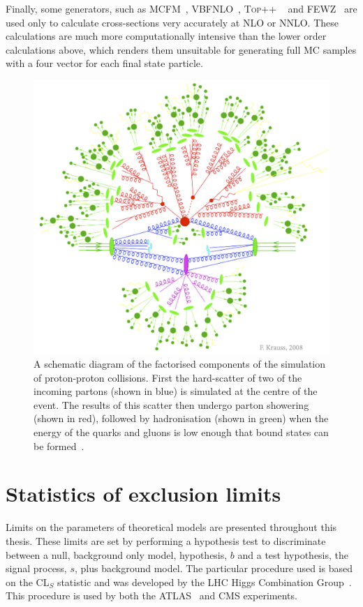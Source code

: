 Finally, some generators, such as MCFM~\cite{PhysRevD.68.094021}, VBFNLO~\cite{Baglio:2014uba,Arnold:2011wj,Arnold20091661}, \textsc{Top++} ~\cite{Czakon20142930} and \textsc{FEWZ}~\cite{PhysRevD.86.094034} are used only to calculate cross-sections very accurately at \ac{NLO} or \ac{NNLO}. These calculations are much more computationally intensive than the lower order calculations above, which renders them unsuitable for generating full \ac{MC} samples with a four vector for each final state particle.

\begin{figure}
  \includegraphics[width=\largefigwidth]{plots/theory/factorisation.png}
  \caption{A schematic diagram of the factorised components of the simulation of proton-proton collisions. First the hard-scatter of two of the incoming partons (shown in blue) is simulated at the centre of the event. The results of this scatter then undergo parton showering (shown in red), followed by hadronisation (shown in green) when the energy of the quarks and gluons is low enough that bound states can be formed~\cite{krauss-diag}.}
  \label{fig:factorisation}
\end{figure}

\section{Statistics of exclusion limits}
\label{sec:stats}
Limits on the parameters of theoretical models are presented throughout this thesis. These limits are set by performing a hypothesis test to discriminate between a null, background only model, hypothesis, $b$ and a test hypothesis, the signal process, $s$, plus background model. The particular procedure used is based on the CL$_{S}$ statistic and was developed by the LHC Higgs Combination Group~\cite{ATL-PHYS-PUB-2011-011}.  This procedure is used by both the ATLAS~\cite{Aad:1129811} and CMS experiments.

